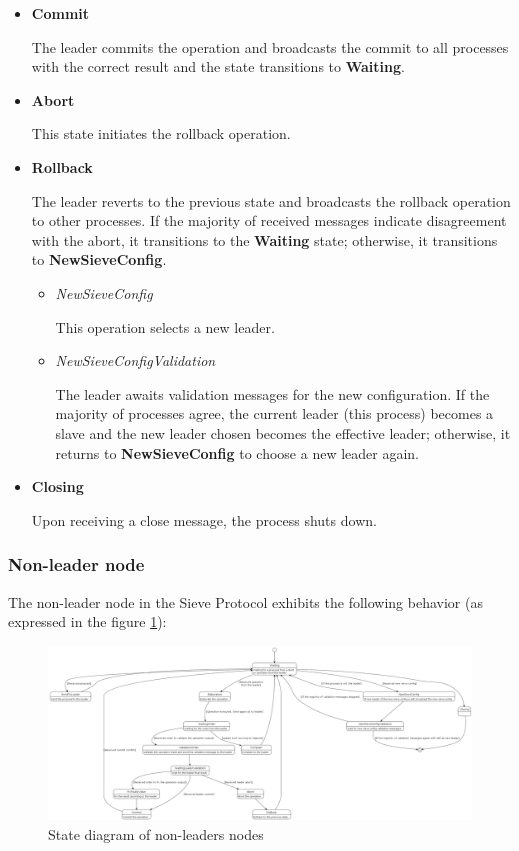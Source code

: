 \documentclass{scrartcl}
\begin{document}
\begin{itemize}
    \item \textbf{Commit}
    
    The leader commits the operation and broadcasts the commit to all processes with the correct result and the state transitions to \textbf{Waiting}.
    
    \item \textbf{Abort}
    
    This state initiates the rollback operation.
    
    \item \textbf{Rollback}
    
    The leader reverts to the previous state and broadcasts the rollback operation to other processes. If the majority of received messages indicate disagreement with the abort, it transitions to the \textbf{Waiting} state; otherwise, it transitions to \textbf{NewSieveConfig}.
    
    \begin{itemize}
        \item \textit{NewSieveConfig}
        
        This operation selects a new leader.
        \item \textit{NewSieveConfigValidation}
        
        The leader awaits validation messages for the new configuration. If the majority of processes agree, the current leader (this process) becomes a slave and the new leader chosen becomes the effective leader; otherwise, it returns to \textbf{NewSieveConfig} to choose a new leader again.
    \end{itemize}

    \item \textbf{Closing}
    
    Upon receiving a close message, the process shuts down.
    
\end{itemize}

\subsubsection{Non-leader node}

The non-leader node in the Sieve Protocol exhibits the following behavior (as expressed in the figure \ref{fig:slave}):

\begin{figure}[H]
    \centering
    \includegraphics[width=1\linewidth]{figures/slave.png}
    \caption{State diagram of non-leaders nodes}
    \label{fig:slave}
\end{figure}
\end{document}
